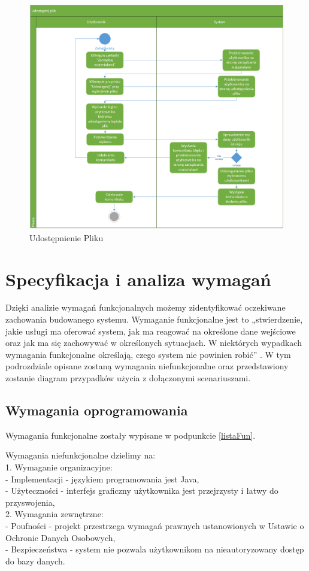	\begin{figure}[H]
	\centering
	\includegraphics[scale=0.5]{Udostepnienie}
	\caption{\label{fig:activity_04}Udostępnienie Pliku}
	\end{figure}
\section{Specyfikacja i analiza wymagań}
Dzięki analizie wymagań funkcjonalnych możemy zidentyfikować oczekiwane zachowania budowanego systemu. Wymaganie funkcjonalne jest to „stwierdzenie, jakie usługi ma oferować system, jak ma reagować na określone dane wejściowe oraz jak ma się zachowywać w określonych sytuacjach. W niektórych wypadkach wymagania funkcjonalne określają, czego system nie powinien robić” \cite{DOC02}. W tym podrozdziale opisane zostaną wymagania niefunkcjonalne oraz przedstawiony zostanie diagram przypadków użycia z dołączonymi scenariuszami.
\subsection{Wymagania oprogramowania}
Wymagania funkcjonalne zostały wypisane w podpunkcie \ref{listaFun}.

Wymagania niefunkcjonalne dzielimy na:\\
1. Wymaganie organizacyjne:\\
- Implementacji - językiem programowania jest Java,\\
- Użyteczności - interfejs graficzny użytkownika jest przejrzysty i łatwy do przyswojenia,\\
2. Wymagania zewnętrzne:	\\	
- Poufności - projekt przestrzega wymagań prawnych ustanowionych w Ustawie o Ochronie Danych Osobowych,\\
- Bezpieczeństwa - system nie pozwala użytkownikom na nieautoryzowany dostęp do bazy danych.\\

